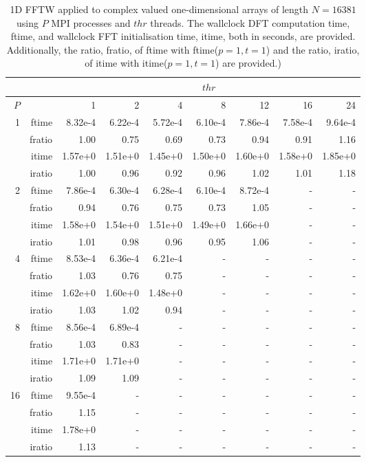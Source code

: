 \documentclass[a4paper]{article}
\begin{document}
\begin{table}[htbp]
\begin{center}
\begin{small}
\begin{tabular}{|r|r|r|r|r|r|r|r|r|}
\hline 
     &  & \multicolumn{7}{c|}{$thr$} \\ \hline
    $P$  &  & 1           & 2    & 4    & 8    & 12   & 16    & 24  \\ \hline\hline
   1 &  ftime &   8.32e-4 &   6.22e-4 &   5.72e-4 &   6.10e-4 &   7.86e-4 &   7.58e-4 &   9.64e-4 \\
   &  fratio &   1.00 &   0.75 &   0.69 &   0.73 &   0.94 &   0.91 &   1.16 \\
   &  itime &   1.57e+0 &   1.51e+0 &   1.45e+0 &   1.50e+0 &   1.60e+0 &   1.58e+0 &   1.85e+0 \\
   &  iratio &   1.00 &   0.96 &   0.92 &   0.96 &   1.02 &   1.01 &   1.18 \\\hline
   2 &  ftime &   7.86e-4 &   6.30e-4 &   6.28e-4 &   6.10e-4 &   8.72e-4 &  - &  - \\
   &  fratio &   0.94 &   0.76 &   0.75 &   0.73 &   1.05 &  - &  - \\
   &  itime &   1.58e+0 &   1.54e+0 &   1.51e+0 &   1.49e+0 &   1.66e+0 &  - &  - \\
   &  iratio &   1.01 &   0.98 &   0.96 &   0.95 &   1.06 &  - &  - \\\hline
   4 &  ftime &   8.53e-4 &   6.36e-4 &   6.21e-4 &  - &  - &  - &  - \\
   &  fratio &   1.03 &   0.76 &   0.75 &  - &  - &  - &  - \\
   &  itime &   1.62e+0 &   1.60e+0 &   1.48e+0 &  - &  - &  - &  - \\
   &  iratio &   1.03 &   1.02 &   0.94 &  - &  - &  - &  - \\\hline
   8 &  ftime &   8.56e-4 &   6.89e-4 &  - &  - &  - &  - &  -\\ 
   &  fratio &   1.03 &   0.83 &  - &  - &  - &  - &  - \\
   &  itime &   1.71e+0 &   1.71e+0 &  - &  - &  - &  - &  - \\
   &  iratio &   1.09 &   1.09 &  - &  - &  - &  - &  - \\\hline
   16 &  ftime &   9.55e-4 &  - &  - &  - &  - &  - &  - \\
   &  fratio &   1.15 &  - &  - &  - &  - &  - &  - \\
   &  itime &   1.78e+0 &  - &  - &  - &  - &  - &  - \\
   &  iratio &   1.13 &  - &  - &  - &  - &  - &  - \\\hline
   \end{tabular}
\caption{1D FFTW applied to complex valued one-dimensional arrays of length $N=16381$ using $P$ MPI processes and $thr$ threads. The wallclock DFT computation time, ftime, and wallclock FFT initialisation time, itime, both in seconds, are provided. Additionally, the ratio, fratio, of ftime  with ftime($p=1,t=1$) and the ratio, iratio, of itime  with itime($p=1,t=1$) are provided.) }\label{Tbl:FFT1d16381}
\end{small}
\end{center}
\end{table}
\end{document}
